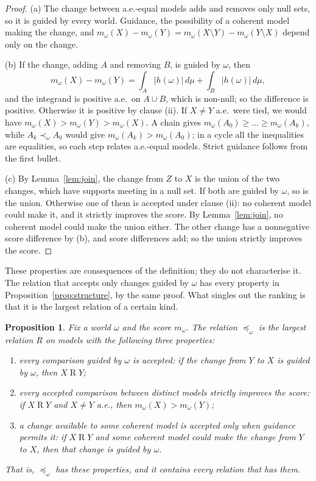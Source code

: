 \documentclass[11pt]{article}
\theoremstyle{plain}
\newtheorem{proposition}[theorem]{Proposition}
\theoremstyle{definition}
\theoremstyle{remark}
\begin{document}
\begin{proof}
(a) The change between a.e.-equal models adds and removes only null sets, so it is guided by
every world. Guidance, the possibility of a coherent model making the change, and $m_\omega(X)
-m_\omega(Y)=m_\omega(X\setminus Y)-m_\omega(Y\setminus X)$ depend only on the change.

(b) If the change, adding $A$ and removing $B$, is guided by $\omega$, then
\[
  m_\omega(X)-m_\omega(Y)=\int_A|h(\omega)|\,d\mu+\int_B|h(\omega)|\,d\mu ,
\]
and the integrand is positive a.e.\ on $A\cup B$, which is non-null; so the difference is
positive. Otherwise it is positive by clause (ii). If $X\ne Y$ a.e.\ were tied, we would have
$m_\omega(X)>m_\omega(Y)>m_\omega(X)$. A chain gives $m_\omega(A_0)\ge\dots\ge m_\omega(A_k)$,
while $A_k\prec_\omega A_0$ would give $m_\omega(A_k)>m_\omega(A_0)$; in a cycle all the
inequalities are equalities, so each step relates a.e.-equal models. Strict guidance follows
from the first bullet.

(c) By Lemma~\ref{lem:join}, the change from $Z$ to $X$ is the union of the two changes, which
have supports meeting in a null set. If both are guided by $\omega$, so is the union. Otherwise
one of them is accepted under clause (ii): no coherent model could make it, and it strictly
improves the score. By Lemma~\ref{lem:join}, no coherent model could make the union either.
The other change has a nonnegative score difference by (b), and score differences add; so the
union strictly improves the score.
\end{proof}

These properties are consequences of the definition; they do not characterise it. The relation
that accepts only changes guided by $\omega$ has every property in
Proposition~\ref{prop:structure}, by the same proof. What singles out the ranking is that it is
the largest relation of a certain kind.

\begin{proposition}\label{prop:maximal}
Fix a world $\omega$ and the score $m_\omega$. The relation $\preceq_\omega$ is the largest
relation $R$ on models with the following three properties:
\begin{enumerate}[label=(\arabic*)]
  \item every comparison guided by $\omega$ is accepted: if the change from $Y$ to $X$ is guided
  by $\omega$, then $X\mathrel RY$;
  \item every accepted comparison between distinct models strictly improves the score: if
  $X\mathrel RY$ and $X\ne Y$ a.e., then $m_\omega(X)>m_\omega(Y)$;
  \item a change available to some coherent model is accepted only when guidance permits it: if
  $X\mathrel RY$ and some coherent model could make the change from $Y$ to $X$, then that change
  is guided by $\omega$.
\end{enumerate}
That is, $\preceq_\omega$ has these properties, and it contains every relation that has them.
\end{proposition}
\end{document}
